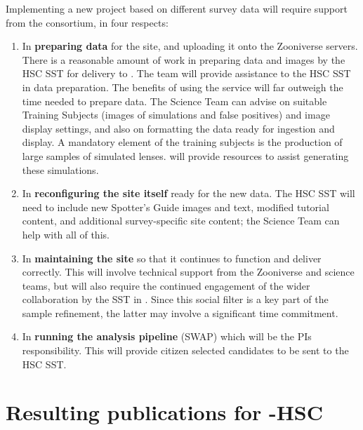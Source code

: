 \documentclass[a4paper,twocolumn]{article}
\begin{document}
Implementing a new project based on different survey data will require support from the \SW consortium, in four respects: 

\begin{enumerate}

\item In {\bf preparing data} for the site, and uploading it onto the
Zooniverse servers. There is a reasonable amount of work in preparing data and images by the HSC SST for delivery to \SW. The \SW team will provide assistance to the HSC SST in data preparation. The benefits of using the \SW service will far outweigh the time needed to prepare data.  The \SW Science Team can advise on suitable Training
Subjects (images of simulations and false positives) and image display settings, and also on formatting the data
ready for ingestion and display. A mandatory element of the training subjects is the production of large samples of simulated lenses. \SW will provide resources to assist generating these simulations. 

\item In {\bf reconfiguring the site itself} ready for the new data. The HSC
SST will need to include new Spotter's Guide images and text,
modified tutorial content, and additional survey-specific site content;
the \SW Science Team can help with all of this.

\item In {\bf maintaining the site} so that it continues to function and deliver
correctly. This will involve technical support from the Zooniverse and \SW science teams,
but will also require the continued engagement of the wider
collaboration by the SST in \Talk. Since this social filter is
a key part of the sample refinement, the latter may involve a
significant time commitment.

\item In {\bf running the \SW analysis pipeline} (SWAP) which will be the \sw PIs responsibility. This will provide citizen selected candidates to be sent to the HSC SST.

\end{enumerate}




\section{Resulting publications for \SW-HSC }
\label{sec:series}
\end{document}
